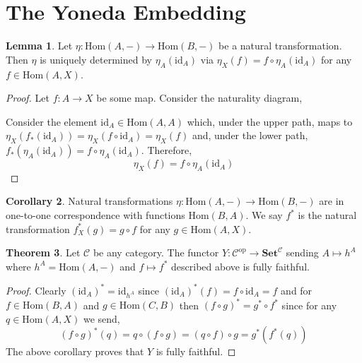 \documentclass[12pt]{article}
\newcommand{\id}{\mathrm{id}}
\newcommand{\Hom}[2]{\mathrm{Hom}\left(#1, #2 \right)}
\newcommand{\C}{\mathcal{C}}
\newcommand{\Set}{\mathbf{Set}}
\newcommand{\op}{\mathrm{op}}
\theoremstyle{remark}
\theoremstyle{definition}
\newtheorem{theorem}{Theorem}[section]
\newtheorem{lemma}[theorem]{Lemma}
\newtheorem{corollary}[theorem]{Corollary}
\begin{document}
\section{The Yoneda Embedding}

\begin{lemma}
Let $\eta : \Hom{A}{-} \to \Hom{B}{-}$ be a natural transformation. Then $\eta$ is uniquely determined by $\eta_A(\id_A)$ via $\eta_X(f) = f \circ \eta_A(\id_A)$ for any $f \in \Hom{A}{X}$.  
\end{lemma}

\begin{proof}
Let $f : A \to X$ be some map.
Consider the naturality diagram,
\begin{center}
\end{center}
Consider the element $\id_A \in \Hom{A}{A}$ which, under the upper path, maps to $\eta_X (f_*(\id_A)) = \eta_X(f \circ \id_A) = \eta_X(f)$ and, under the lower path, $f_*(\eta_A(\id_A)) = f \circ \eta_A(\id_A)$. Therefore,
\[ \eta_X(f) = f \circ \eta_A(\id_A) \]
\end{proof}

\begin{corollary}
Natural transformations $\eta : \Hom{A}{-} \to \Hom{B}{-}$ are in one-to-one correspondence with functions $\Hom{B}{A}$. We say $f^*$ is the natural transformation $f^*_X(g) = g \circ f$ for any $g \in \Hom{A}{X}$.  
\end{corollary}

\begin{theorem}
Let $\C$ be any category. The functor $Y : \C^{\op} \to \Set^{\C}$ sending $A \mapsto h^A$ where $h^A = \Hom{A}{-}$ and $f \mapsto f^*$ described above is fully faithful.
\end{theorem}

\begin{proof}
Clearly $(\id_A)^* = \id_{h^A}$ since $(\id_A)^*(f) = f \circ \id_A = f$ and for $f \in \Hom{B}{A}$ and $g \in \Hom{C}{B}$ then $(f \circ g)^* = g^* \circ f^*$ since for any $q \in \Hom{A}{X}$ we send,
\[ (f \circ g)^*(q) = q \circ (f \circ g) = (q \circ f) \circ g = g^*(f^*(q)) \]
The above corollary proves that $Y$ is fully faithful.    
\end{proof}
\end{document}
